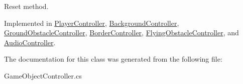 Reset method. 



Implemented in \hyperlink{class_player_controller_a8fd9b4a9dc641b4b4c9ca0949f083b41}{Player\+Controller}, \hyperlink{class_background_controller_a39841506fc252b3515273a58df8b852f}{Background\+Controller}, \hyperlink{class_ground_obstacle_controller_ab218c8d1be89a93ab3c0a18ba3fc9d67}{Ground\+Obstacle\+Controller}, \hyperlink{class_border_controller_a8c5ba488fa92cd7753ebce7e3a947a4e}{Border\+Controller}, \hyperlink{class_flying_obstacle_controller_ab2b5e0c2f00348c159ded251e1ca61c0}{Flying\+Obstacle\+Controller}, and \hyperlink{class_audio_controller_a20e52c6c93067e734270bbd3e1da204f}{Audio\+Controller}.



The documentation for this class was generated from the following file\+:\begin{DoxyCompactItemize}
\item 
Game\+Object\+Controller.\+cs\end{DoxyCompactItemize}
